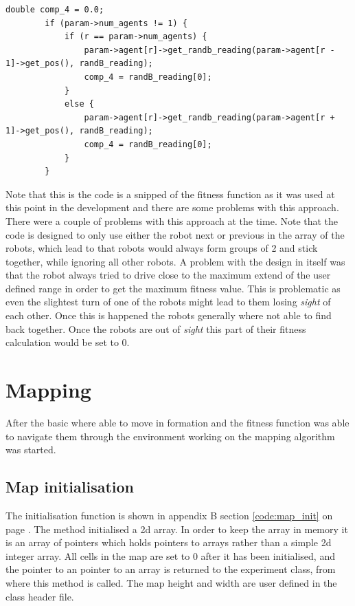 \begin{lstlisting}[caption = {Fitness function calculation to consider the distance between 2 robots}]
  double comp_4 = 0.0;
        if (param->num_agents != 1) {
            if (r == param->num_agents) {
                param->agent[r]->get_randb_reading(param->agent[r - 1]->get_pos(), randB_reading);
                comp_4 = randB_reading[0];
            }
            else {
                param->agent[r]->get_randb_reading(param->agent[r + 1]->get_pos(), randB_reading);
                comp_4 = randB_reading[0];
            }
        }
\end{lstlisting}\label{chap3:comp4_code}

Note that this is the code is a snipped of the fitness function as it was used at this point in the development and there are some problems with this approach. 
There were a couple of problems with this approach at the time. Note that the code is designed to only use either the robot next or previous in the array of the robots, which lead to that robots would always form groups of 2 and stick together, while ignoring all other robots.
A problem with the design in itself was that the robot always tried to drive close to the maximum extend of the user defined range in order to get the maximum fitness value. This is problematic as even the slightest turn of one of the robots might lead to them losing \textit{sight} of each other. Once this is happened the robots generally where not able to find back together. Once the robots are out of \textit{sight} this part of their fitness calculation would be set to 0. \\

\section{Mapping}
After the basic where able to move in formation and the fitness function was able to navigate them through the environment working on the mapping algorithm was started. \\
\subsection{Map initialisation}
\label{chap3:map_init}
The initialisation function is shown in appendix B section \ref{code:map_init} on page \pageref{code:map_init}. 
The method initialised a 2d array. In order to keep the array in memory it is an array of pointers which holds pointers to arrays rather than a simple 2d integer array.
All cells in the map are set to 0 after it has been initialised, and the pointer to an pointer to an array is returned to the experiment class, from where this method is called.
The map height and width are user defined in the class header file.

